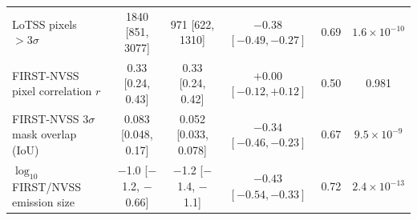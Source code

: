 \begin{table}
\begin{tabular}{lccccc}
LoTSS pixels $>3\sigma$ & 1840 [851, 3077] & 971 [622, 1310] & $-0.38$ $[-0.49, -0.27]$ & 0.69 & $1.6\times10^{-10}$ \\
FIRST-NVSS pixel correlation $r$ & 0.33 [0.24, 0.43] & 0.33 [0.24, 0.42] & $+0.00$ $[-0.12, +0.12]$ & 0.50 & 0.981 \\
FIRST-NVSS $3\sigma$ mask overlap (IoU) & 0.083 [0.048, 0.17] & 0.052 [0.033, 0.078] & $-0.34$ $[-0.46, -0.23]$ & 0.67 & $9.5\times10^{-9}$ \\
$\log_{10}$ FIRST/NVSS emission size & $-$1.0 [$-$1.2, $-$0.66] & $-$1.2 [$-$1.4, $-$1.1] & $-0.43$ $[-0.54, -0.33]$ & 0.72 & $2.4\times10^{-13}$ \\
\hline
\end{tabular}
\end{table}